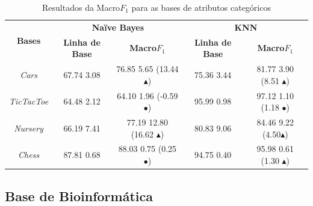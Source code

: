 \documentclass[10pt, red]{beamer}
\newcommand{\triangOK}{\textcolor[rgb]{00,0.45,0.10}{$\blacktriangle$}}
\newcommand{\ball}{\textcolor[rgb]{0.7,0.70,0.0}{$\bullet$}}
\newcommand*\cred[1]{\textcolor[rgb]{1,0,0}{#1}}   %
\begin{document}
{\begin{table}[h!]
\centering
\caption{Resultados da Macro$F_1$ para as bases de atributos categóricos}
\label{tab::cat-macro}
\scriptsize
\begin{adjustwidth}{-0.5cm}{-0.5cm}
\begin{tabular}{|c||c|c|c|c|}
\toprule
\multirow{2}{*}{\textbf{Bases}} & \multicolumn{2}{c|}{\textbf{Naïve Bayes}} & \multicolumn{2}{c|}{\textbf{KNN}}\tabularnewline
\cline{2-5} 
 & \textbf{Linha de Base} & \textbf{Macro$F_1$} & \textbf{Linha de Base} & \textbf{Macro$F_1$}\tabularnewline
\midrule
\hline
\textit{Cars} & 67.74 \textpm{} 3.08 & 76.85 \textpm{} 5.65 (\cred{13.44} \triangOK) & 75.36 \textpm{} 3.44 & 81.77 \textpm{} 3.90 (\cred{8.51} \triangOK)\tabularnewline
\hline 
\textit{TicTacToe} & 64.48 \textpm{} 2.12 & 64.10 \textpm{} 1.96 (-0.59 \ball) & 95.99 \textpm{} 0.98 & 97.12 \textpm{} 1.10 (1.18 \ball)\tabularnewline
\hline 
\textit{Nursery} & 66.19 \textpm{} 7.41 & 77.19 \textpm{} 12.80 (\cred{16.62} \triangOK) & 80.83 \textpm{} 9.06  &	84.46 \textpm{} 9.22 (\cred{4.50}\triangOK) \tabularnewline
\hline 
\textit{Chess} & 87.81 \textpm{} 0.68 & 88.03 \textpm{} 0.75 (0.25 \ball) & 94.75 \textpm{} 0.40  & 95.98 \textpm{} 0.61 (1.30 \triangOK)\tabularnewline
\bottomrule
\end{tabular}
\end{adjustwidth}
\end{table}

}

\subsection{Base de Bioinformática}


\end{document}
